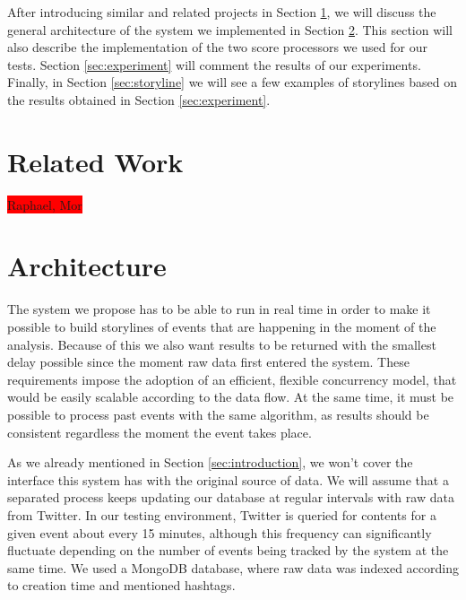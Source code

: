 \documentclass{sig-alternate}
\newcommand{\todo}[1]{\colorbox{red}{#1}}
\begin{document}
After introducing similar and related projects in Section \ref{sec:related-work}, we will discuss the general architecture of the system we implemented in Section \ref{sec:architecture}. This section will also describe the implementation of the two score processors we used for our tests. Section \ref{sec:experiment} will comment the results of our experiments. Finally, in Section \ref{sec:storyline} we will see a few examples of storylines based on the results obtained in Section \ref{sec:experiment}.


\section{Related Work}
\label{sec:related-work}

\todo{Raphael, Mor}


\section{Architecture}
\label{sec:architecture}

The system we propose has to be able to run in real time in order to make it possible to build storylines of events that are happening in the moment of the analysis. Because of this we also want results to be returned with the smallest delay possible since the moment raw data first entered the system. These requirements impose the adoption of an efficient, flexible concurrency model, that would be easily scalable according to the data flow. At the same time, it must be possible to process past events with the same algorithm, as results should be consistent regardless the moment the event takes place.

As we already mentioned in Section \ref{sec:introduction}, we won't cover the interface this system has with the original source of data. We will assume that a separated process keeps updating our database at regular intervals with raw data from Twitter. In our testing environment, Twitter is queried for contents for a given event about every 15 minutes, although this frequency can significantly fluctuate depending on the number of events being tracked by the system at the same time. We used a MongoDB database, where raw data was indexed according to creation time and mentioned hashtags.
\end{document}
